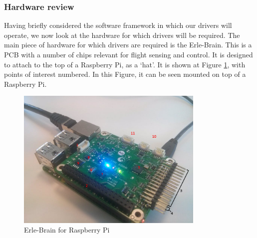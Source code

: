 \documentclass[capstone_report.tex]{subfiles}
\begin{document}
    \subsubsection{Hardware review}
    Having briefly considered the software framework in which our drivers will operate, we now look at the hardware for which drivers will be required. The main piece of hardware for which drivers are required is the Erle-Brain. This is a PCB with a number of chips relevant for flight sensing and control. It is designed to attach to the top of a Raspberry Pi, as a `hat'. It is shown at Figure \ref{fig:erleHat}, with points of interest numbered. In this Figure, it can be seen mounted on top of a Raspberry Pi.

    \begin{figure}[H]
        \centering
        \includegraphics[width=0.8\textwidth]{imgs/erleHat.jpg}
        \caption{Erle-Brain for Raspberry Pi\label{fig:erleHat}}
    \end{figure}
\end{document}
